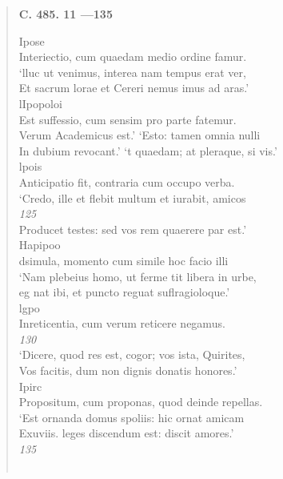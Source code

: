 \documentclass[11pt, a4paper]{report}
\begin{document}
\begin{verse}
     \marginpar{[16]} \begin{center} \textbf{C. 485. 11 —135} \end{center}Ipose \\ Interiectio, cum quaedam medio ordine famur. \\ ‘lluc ut venimus, interea nam tempus erat ver, \\ Et sacrum lorae et Cereri nemus imus ad aras.’ \\ lIpopoloi \\ Est suffessio, cum sensim pro parte fatemur. \\ Verum Academicus est.’ ‘Esto: tamen omnia nulli \\ In dubium revocant.’ ‘t quaedam; at pleraque, si vis.’ \\ lpois \\ Anticipatio fit, contraria cum occupo verba. \\ ‘Credo, ille et flebit multum et iurabit, amicos \\ \textit{125} \\ Producet testes: sed vos rem quaerere par est.’ \\ Hapipoo \\ dsimula, momento cum simile hoc facio illi \\ ‘Nam plebeius homo, ut ferme tit libera in urbe, \\ eg \lbrack nat \rbrack  ibi, et puncto reguat suflragioloque.’ \\ lgpo \\ Inreticentia, cum verum reticere negamus. \\ \textit{130} \\ ‘Dicere, quod res est, cogor; vos ista, Quirites, \\ Vos facitis, dum non dignis donatis honores.’ \\ Ipirc \\ Propositum, cum proponas, quod deinde repellas. \\ ‘Est ornanda domus spoliis: hic ornat amicam \\ Exuviis. leges discendum est: discit amores.’ \\ \textit{135} \\ 
        ﻿\pagebreak 

\end{verse}
\end{document}
